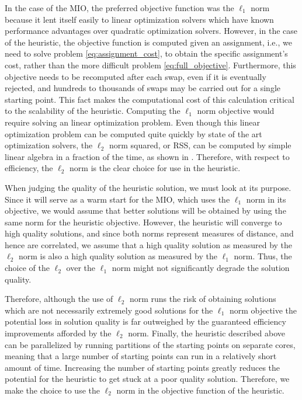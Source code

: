 In the case of the MIO, the preferred objective function was the  $\ell_1$ norm because it lent itself easily to linear optimization solvers which have known performance advantages over quadratic optimization solvers. However, in the case of the heuristic, the objective function is computed given an assignment, i.e., we need to solve problem \eqref{eq:assignment_cost}, to obtain the specific assignment's cost, rather than the more difficult problem \eqref{eq:full_objective}. Furthermore, this objective needs to be recomputed after each swap, even if it is eventually rejected, and hundreds to thousands of swaps may be carried out for a single starting point. This fact makes the computational cost of this calculation critical to the scalability of the heuristic.  Computing the $\ell_1$ norm objective would require solving an linear optimization problem. Even though this linear optimization problem can be computed quite quickly by state of the art optimization solvers, the $\ell_2$ norm squared, or RSS, can be computed by simple linear algebra in a fraction of the time, as shown in \cite{RSS-Matrix}. Therefore, with respect to efficiency, the $\ell_2$ norm is the clear choice for use in the heuristic.

When judging the quality of the heuristic solution, we must look at its purpose. Since it will serve as a warm start for the MIO, which uses the $\ell_1$ norm in its objective, we would assume that better solutions will be obtained by using the same norm for the heuristic objective. However, the heuristic will converge to high quality solutions, and since both norms represent measures of distance, and hence are correlated, we assume that a high quality solution as measured by the $\ell_2$ norm is also a high quality solution as measured by the $\ell_1$ norm. Thus, the choice of the $\ell_2$ over the $\ell_1$ norm might not significantly degrade the solution quality.

Therefore, although the use of $\ell_2$ norm runs the risk of obtaining solutions which are not necessarily extremely good solutions for the $\ell_1$ norm objective the potential loss in solution quality is far outweighed by the guaranteed efficiency improvements afforded by the $\ell_2$ norm. 
Finally, the heuristic described above can be parallelized by running partitions of the starting points on separate cores, meaning that a large number of starting points can run in a relatively short amount of time. Increasing the number of starting points greatly reduces the potential for the heuristic to get stuck at a poor quality solution. Therefore, we make the choice to use the $\ell_2$ norm in the objective function of the heuristic. 